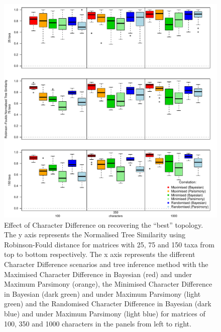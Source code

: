 \documentclass[12pt,letterpaper]{article}
\begin{document}
\begin{figure}[!htbp]
\centering
   \includegraphics[width=1\textwidth]{Figures/RF_results_best.pdf} %
\caption{\small{Effect of Character Difference on recovering the ``best'' topology. The y axis represents the Normalised Tree Similarity using Robinson-Fould distance for matrices with 25, 75 and 150 taxa from top to bottom respectively. The x axis represents the different Character Difference scenarios and tree inference method with the Maximised Character Difference in Bayesian (red) and under Maximum Parsimony (orange), the Minimised Character Difference in Bayesian (dark green) and under Maximum Parsimony (light green) and the Randomised Character Difference in Bayesian (dark blue) and under Maximum Parsimony (light blue) for matrices of 100, 350 and 1000 characters in the panels from left to right.}}
\label{Fig:RF_results_best}
\end{figure}
\end{document}
